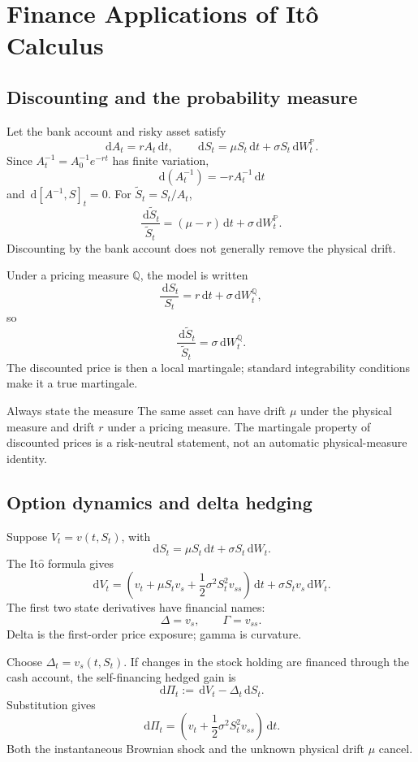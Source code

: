 \documentclass[10pt]{article}
\newcommand{\Pp}{\mathbb P}
\newcommand{\Q}{\mathbb Q}
\newcommand{\1}{\mathbf 1}
\newcommand{\dd}{\,\mathrm d}
\newcommand{\Ito}{\mathrm{It\hat{o}}}
\theoremstyle{definition}
\begin{document}
\section{Finance Applications of It\^o Calculus}

\subsection{Discounting and the probability measure}

Let the bank account and risky asset satisfy
\[
\dd A_t=rA_t\dd t,\qquad
\dd S_t=\mu S_t\dd t+\sigma S_t\dd W_t^{\Pp}.
\]
Since \(A_t^{-1}=A_0^{-1}e^{-rt}\) has finite variation,
\[
\dd(A_t^{-1})=-rA_t^{-1}\dd t
\]
and \(\dd[A^{-1},S]_t=0\). For
\(\widetilde S_t=S_t/A_t\),
\[
\boxed{
\frac{\dd\widetilde S_t}{\widetilde S_t}
=(\mu-r)\dd t+\sigma\dd W_t^{\Pp}.}
\]
Discounting by the bank account does not generally remove the physical drift.

Under a pricing measure \(\Q\), the model is written
\[
\frac{\dd S_t}{S_t}
=r\dd t+\sigma\dd W_t^{\Q},
\]
so
\[
\frac{\dd\widetilde S_t}{\widetilde S_t}
=\sigma\dd W_t^{\Q}.
\]
The discounted price is then a local martingale; standard integrability
conditions make it a true martingale.

\begin{warningbox}{Always state the measure}
The same asset can have drift \(\mu\) under the physical measure and drift
\(r\) under a pricing measure. The martingale property of discounted prices
is a risk-neutral statement, not an automatic physical-measure identity.
\end{warningbox}

\subsection{Option dynamics and delta hedging}

Suppose \(V_t=v(t,S_t)\), with
\[
\dd S_t=\mu S_t\dd t+\sigma S_t\dd W_t.
\]
The \(\Ito\) formula gives
\[
\boxed{
\dd V_t
=\left(
v_t+\mu S_tv_s+\frac12\sigma^2S_t^2v_{ss}
\right)\dd t
+\sigma S_tv_s\dd W_t.}
\]
The first two state derivatives have financial names:
\[
\Delta=v_s,\qquad \Gamma=v_{ss}.
\]
Delta is the first-order price exposure; gamma is curvature.

Choose \(\Delta_t=v_s(t,S_t)\). If changes in the stock holding are financed
through the cash account, the self-financing hedged gain is
\[
\dd\Pi_t:=\dd V_t-\Delta_t\dd S_t.
\]
Substitution gives
\[
\boxed{
\dd\Pi_t
=\left(v_t+\frac12\sigma^2S_t^2v_{ss}\right)\dd t.}
\]
Both the instantaneous Brownian shock and the unknown physical drift
\(\mu\) cancel.
\end{document}

